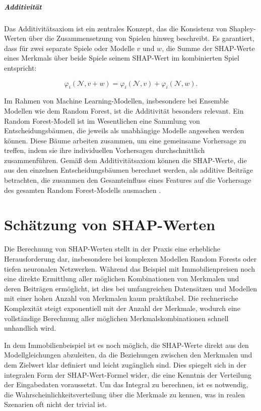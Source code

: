 \paragraph{Additivität}

Das Additivitätsaxiom ist ein zentrales Konzept, das die Konsistenz von Shapley-Werten 
über die Zusammensetzung von Spielen hinweg beschreibt. Es garantiert, 
dass für zwei separate Spiele oder Modelle \(v\) und \(w\), die Summe der SHAP-Werte eines 
Merkmals über beide Spiele seinem SHAP-Wert im kombinierten Spiel entspricht:

\begin{equation}
    \varphi_i(\mathcal{N}, v + w) = \varphi_i (\mathcal{N}, v) + \varphi_i (\mathcal{N}, w).
\end{equation}

Im Rahmen von Machine Learning-Modellen, insbesondere bei Ensemble Modellen wie dem Random Forest, 
ist die Additivität besonders relevant. Ein Random Forest-Modell ist im Wesentlichen eine Sammlung 
von Entscheidungsbäumen, die jeweils als unabhängige Modelle angesehen werden können. 
Diese Bäume arbeiten zusammen, um eine gemeinsame Vorhersage zu treffen, indem sie ihre 
individuellen Vorhersagen durchschnittlich zusammenführen. Gemäß dem Additivitätsaxiom können die SHAP-Werte, 
die aus den einzelnen Entscheidungsbäumen berechnet werden, als additive Beiträge betrachten, 
die zusammen den Gesamteinfluss eines Features auf die Vorhersage des gesamten Random Forest-Modells ausmachen \cite[S. 32]{Molnar_2023}.


\chapter{Schätzung von SHAP-Werten}
\label{sec:estimators}

Die Berechnung von SHAP-Werten stellt in der Praxis eine erhebliche Herausforderung dar, 
insbesondere bei komplexen Modellen Random Forests oder tiefen neuronalen Netzwerken. 
Während das Beispiel mit Immobilienpreisen noch eine direkte Ermittlung aller möglichen Kombinationen 
von Merkmalen und deren Beiträgen ermöglicht, ist dies bei umfangreichen Datensätzen und Modellen 
mit einer hohen Anzahl von Merkmalen kaum praktikabel. Die rechnerische Komplexität steigt exponentiell 
mit der Anzahl der Merkmale, wodurch eine vollständige Berechnung aller möglichen Merkmalskombinationen schnell unhandlich wird.

In dem Immobilienbeispiel ist es noch möglich, die SHAP-Werte direkt aus den Modellgleichungen abzuleiten, 
da die Beziehungen zwischen den Merkmalen und dem Zielwert klar definiert und leicht zugänglich sind. 
Dies spiegelt sich in der integralen Form der SHAP-Wert-Formel wider, die eine Kenntnis der Verteilung der 
Eingabedaten voraussetzt. Um das Integral zu berechnen, ist es notwendig, die Wahrscheinlichkeitsverteilung 
über die Merkmale zu kennen, was in realen Szenarien oft nicht der trivial ist.

